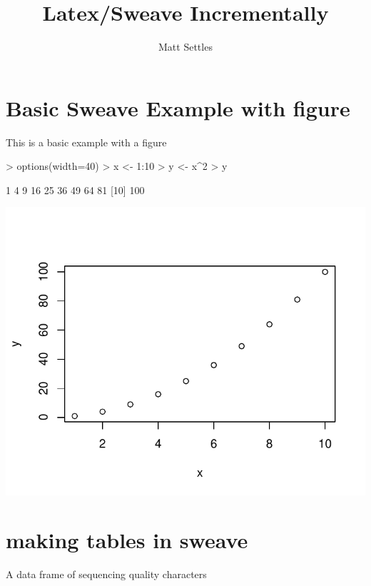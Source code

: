 \documentclass{article}
\title { Latex/Sweave Incrementally}
\author { Matt Settles }
\begin{document}
\maketitle

\section{Basic Sweave Example with figure}
This is a basic example with a figure

\begin{Schunk}
\begin{Sinput}
> options(width=40)
> x <- 1:10
> y <- x^2
> y
\end{Sinput}
\begin{Soutput}
 [1]   1   4   9  16  25  36  49  64  81
[10] 100
\end{Soutput}
\end{Schunk}

\begin{center}
\includegraphics{Sweave-002}
\end{center}

\section{making tables in sweave}
A data frame of sequencing quality characters
\end{document}
